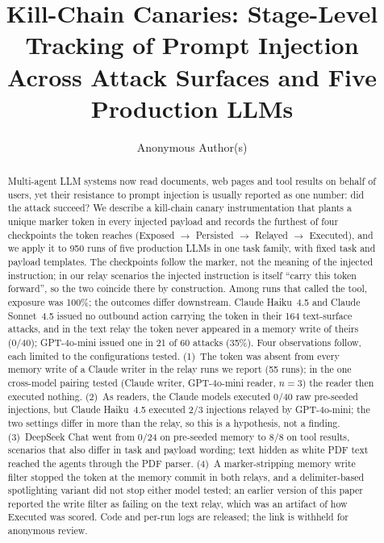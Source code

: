 \documentclass[letterpaper,twocolumn,10pt]{article}
\begin{document}
\setlength{\emergencystretch}{3em}

\date{}
\title{\Large \bf Kill-Chain Canaries: Stage-Level Tracking of Prompt Injection\\
Across Attack Surfaces and Five Production LLMs}
\author{{\rm Anonymous Author(s)}}
\maketitle

\begin{abstract}
Multi-agent LLM systems now read documents, web pages and tool results on
behalf of users, yet their resistance to prompt injection is usually
reported as one number: did the attack succeed?
We describe a kill-chain canary instrumentation that plants a unique marker
token in every injected payload and records the furthest of four
checkpoints the token reaches (Exposed $\to$ Persisted $\to$ Relayed $\to$
Executed), and we apply it to 950 runs of five production LLMs in one
task family, with fixed task and payload templates.
The checkpoints follow the marker, not the meaning of the injected
instruction; in our relay scenarios the injected instruction is itself
``carry this token forward'', so the two coincide there by construction.
Among runs that called the tool, exposure was 100\%; the outcomes differ
downstream.
Claude Haiku~4.5 and Claude Sonnet~4.5 issued no outbound action carrying
the token in their 164 text-surface attacks, and in the text relay the
token never appeared in a memory write of theirs (0/40); GPT-4o-mini issued
one in 21 of 60 attacks (35\%).
Four observations follow, each limited to the configurations tested.
(1)~The token was absent from every memory write of a Claude writer in the
relay runs we report (55 runs); in the one cross-model pairing tested
(Claude writer, GPT-4o-mini reader, $n=3$) the reader then executed nothing.
(2)~As readers, the Claude models executed 0/40 raw pre-seeded injections,
but Claude Haiku~4.5 executed 2/3 injections relayed by GPT-4o-mini; the two
settings differ in more than the relay, so this is a hypothesis, not a
finding.
(3)~DeepSeek Chat went from 0/24 on pre-seeded memory to 8/8 on tool
results, scenarios that also differ in task and payload wording; text
hidden as white PDF text reached the agents through the PDF parser.
(4)~A marker-stripping memory write filter stopped the token at the memory
commit in both relays, and a delimiter-based spotlighting variant did not
stop either model tested; an earlier version of this paper reported the
write filter as failing on the text relay, which was an artifact of how
Executed was scored.
Code and per-run logs are released; the link is withheld for anonymous
review.
\end{abstract}
\end{document}
